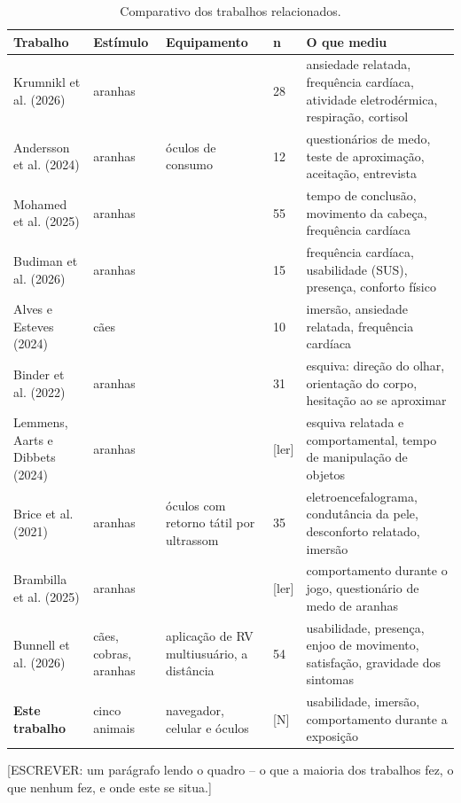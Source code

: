 \begin{table}[htbp]
\centering
\caption{Comparativo dos trabalhos relacionados.}
\label{tab:relacionados}
\footnotesize
\begin{tabular}{>{\raggedright\arraybackslash}p{2.5cm}>{\raggedright\arraybackslash}p{1.6cm}>{\raggedright\arraybackslash}p{2.4cm}p{0.6cm}>{\raggedright\arraybackslash}p{4.6cm}}
\toprule
\textbf{Trabalho} & \textbf{Estímulo} & \textbf{Equipamento} & \textbf{n} & \textbf{O que mediu} \\
\midrule
Krumnikl et al. (2026) & aranhas & [ler] & 28 &
ansiedade relatada, frequência cardíaca, atividade eletrodérmica,
respiração, cortisol \\
Andersson et al. (2024) & aranhas & óculos de consumo & 12 &
questionários de medo, teste de aproximação, aceitação, entrevista \\
Mohamed et al. (2025) & aranhas & [ler] & 55 &
tempo de conclusão, movimento da cabeça, frequência cardíaca \\
Budiman et al. (2026) & aranhas & [ler] & 15 &
frequência cardíaca, usabilidade (SUS), presença, conforto físico \\
Alves e Esteves (2024) & cães & [ler] & 10 &
imersão, ansiedade relatada, frequência cardíaca \\
Binder et al. (2022) & aranhas & [ler] & 31 &
esquiva: direção do olhar, orientação do corpo, hesitação ao se
aproximar \\
Lemmens, Aarts e Dibbets (2024) & aranhas & [ler] & [ler] &
esquiva relatada e comportamental, tempo de manipulação de objetos \\
Brice et al. (2021) & aranhas & óculos com retorno tátil por ultrassom & 35 &
eletroencefalograma, condutância da pele, desconforto relatado, imersão \\
Brambilla et al. (2025) & aranhas & [ler] & [ler] &
comportamento durante o jogo, questionário de medo de aranhas \\
Bunnell et al. (2026) & cães, cobras, aranhas & aplicação de RV multiusuário, a distância & 54 &
usabilidade, presença, enjoo de movimento, satisfação, gravidade dos
sintomas \\
\addlinespace
\textbf{Este trabalho} & cinco animais & navegador, celular e óculos & [N] &
usabilidade, imersão, comportamento durante a exposição \\
\bottomrule
\end{tabular}
\end{table}


[ESCREVER: um parágrafo lendo o quadro -- o que a maioria dos
trabalhos fez, o que nenhum fez, e onde este se situa.]
